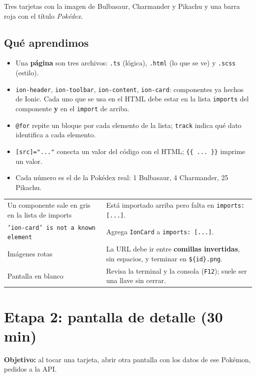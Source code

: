 \documentclass[11pt,a4paper]{article}
\newcommand{\cmd}[1]{\texttt{#1}}
\begin{document}
\begin{resultado}
Tres tarjetas con la imagen de Bulbasaur, Charmander y Pikachu y una barra roja con el t\'itulo \emph{Pok\'edex}.
\end{resultado}
\subsection*{Qu\'e aprendimos}
\begin{itemize}
\item Una \textbf{p\'agina} son tres archivos: \texttt{.ts} (l\'ogica), \texttt{.html} (lo que se ve) y \texttt{.scss} (estilo).
\item \texttt{ion-header}, \texttt{ion-toolbar}, \texttt{ion-content}, \texttt{ion-card}: componentes ya hechos de Ionic. Cada uno que se usa en el HTML debe estar en la lista \texttt{imports} del componente \textbf{y} en el \texttt{import} de arriba.
\item \cmd{@for} repite un bloque por cada elemento de la lista; \cmd{track} indica qu\'e dato identifica a cada elemento.
\item \cmd{[src]="..."} conecta un valor del c\'odigo con el HTML; \cmd{\{\{ ... \}\}} imprime un valor.
\item Cada n\'umero es el de la Pok\'edex real: 1 Bulbasaur, 4 Charmander, 25 Pikachu.
\end{itemize}
\begin{alerta}
\begin{center}
\begin{tabularx}{\linewidth}{@{}>{\raggedright\arraybackslash}p{5cm} >{\raggedright\arraybackslash}X@{}}
Un componente sale en gris en la lista de imports & Est\'a importado arriba pero falta en \texttt{imports: [...]}. \\
\texttt{'ion-card' is not a known element} & Agrega \texttt{IonCard} a \texttt{imports: [...]}. \\
Im\'agenes rotas & La URL debe ir entre \textbf{comillas invertidas}, sin espacios, y terminar en \texttt{\$\{id\}.png}. \\
Pantalla en blanco & Revisa la terminal y la consola (\texttt{F12}); suele ser una llave sin cerrar. \\
\end{tabularx}
\end{center}
\end{alerta}

\section{Etapa 2: pantalla de detalle (30 min)}
\textbf{Objetivo:} al tocar una tarjeta, abrir otra pantalla con los datos de ese Pok\'emon, pedidos a la API.
\end{document}
